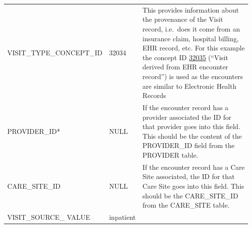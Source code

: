 \documentclass[11pt]{book}
\theoremstyle{definition}
\theoremstyle{definition}
\theoremstyle{definition}
\theoremstyle{remark}
\begin{document}
\begin{longtable}[]{@{}lll@{}}
\begin{minipage}[t]{0.28\columnwidth}\raggedright
VISIT\_TYPE\_CONCEPT\_ID\strut
\end{minipage} & \begin{minipage}[t]{0.15\columnwidth}\raggedright
32034\strut
\end{minipage} & \begin{minipage}[t]{0.49\columnwidth}\raggedright
This provides information about the provenance of the Visit record, i.e.~does it come from an insurance claim, hospital billing, EHR record, etc. For this example the concept ID \href{http://athena.ohdsi.org/search-terms/terms/32035}{32035} (``Visit derived from EHR encounter record'') is used as the encounters are similar to Electronic Health Records\strut
\end{minipage}\tabularnewline
\begin{minipage}[t]{0.28\columnwidth}\raggedright
PROVIDER\_ID*\strut
\end{minipage} & \begin{minipage}[t]{0.15\columnwidth}\raggedright
NULL\strut
\end{minipage} & \begin{minipage}[t]{0.49\columnwidth}\raggedright
If the encounter record has a provider associated the ID for that provider goes into this field. This should be the content of the PROVIDER\_ID field from the PROVIDER table.\strut
\end{minipage}\tabularnewline
\begin{minipage}[t]{0.28\columnwidth}\raggedright
CARE\_SITE\_ID\strut
\end{minipage} & \begin{minipage}[t]{0.15\columnwidth}\raggedright
NULL\strut
\end{minipage} & \begin{minipage}[t]{0.49\columnwidth}\raggedright
If the encounter record has a Care Site associated, the ID for that Care Site goes into this field. This should be the CARE\_SITE\_ID from the CARE\_SITE table.\strut
\end{minipage}\tabularnewline
\begin{minipage}[t]{0.28\columnwidth}\raggedright
VISIT\_SOURCE\_ VALUE\strut
\end{minipage} & \begin{minipage}[t]{0.15\columnwidth}\raggedright
inpatient\strut
\end{minipage} & \begin{minipage}[t]{0.49\columnwidth}\raggedright

\end{minipage}
\end{longtable}
\end{document}
